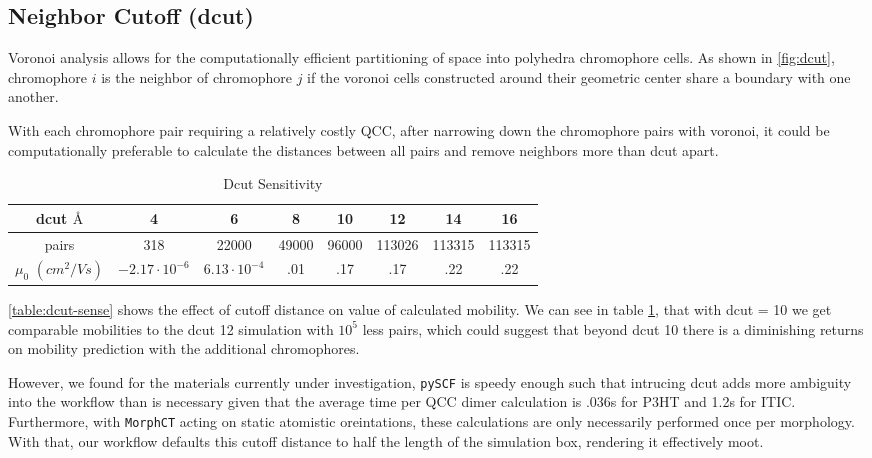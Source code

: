 \subsection{Neighbor Cutoff (dcut)}
\label{dcutresults}
Voronoi analysis allows for the computationally efficient partitioning of space into
polyhedra chromophore cells. As shown in \ref{fig:dcut}, chromophore $i$ is the neighbor of chromophore $j$
if the voronoi cells constructed around their geometric center
share a boundary with one another. 

With each chromophore pair requiring a relatively costly QCC, after narrowing down the chromophore pairs with voronoi, it
could be
computationally preferable to calculate the distances between all pairs and remove neighbors more than dcut
apart.

\begin{table}
\caption{Dcut Sensitivity}
\centering %
\begin{tabular}{c c c c c c c c} %
\hline\hline %
    dcut $\text{\AA}$ & 4 & 6 & 8 & 10 & 12 & 14 & 16 \\ [0.5ex] %
\hline  %
pairs & 318 & 22000 & 49000 & 96000 & 113026 & 113315 & 113315 \\ [1ex]%
$\mu_{0}$ $(cm^{2}/Vs)$ & $-2.17 \cdot 10^{-6}$ & $6.13 \cdot 10^{-4}$ & .01 & .17 & .17 & .22 & .22 \\ [1ex] %
\hline %
\end{tabular}
\label{table:dcut-sense} %
\end{table}

\autoref{table:dcut-sense} shows the effect of cutoff distance on value of
calculated mobility.  
 We can see in table \ref{table:dcut-sense}, that with dcut = 10 we get comparable mobilities to the
dcut 12 simulation with $10^5$ less
pairs, which could suggest that beyond dcut 10 there is a diminishing returns on mobility prediction with the
additional chromophores. 

However, we found for the materials currently under investigation,
\texttt{pySCF} is speedy enough such that intrucing dcut adds more ambiguity
into the workflow than is necessary given that the average time per QCC dimer calculation is .036s for P3HT and
1.2s for ITIC. Furthermore, with \texttt{MorphCT} acting on static atomistic oreintations, these calculations 
are only necessarily performed once per morphology. With that, our workflow defaults this cutoff distance to half
the length of the simulation box, rendering it effectively moot. 

